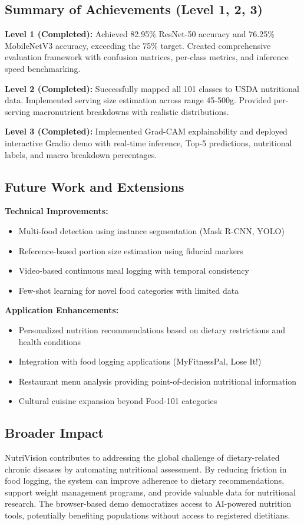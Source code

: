 \documentclass[conference]{IEEEtran}
\begin{document}
\subsection{Summary of Achievements (Level 1, 2, 3)}
\textbf{Level 1 (Completed):} Achieved 82.95\% ResNet-50 accuracy and 76.25\% MobileNetV3 accuracy, exceeding the 75\% target. Created comprehensive evaluation framework with confusion matrices, per-class metrics, and inference speed benchmarking.

\textbf{Level 2 (Completed):} Successfully mapped all 101 classes to USDA nutritional data. Implemented serving size estimation across range 45-500g. Provided per-serving macronutrient breakdowns with realistic distributions.

\textbf{Level 3 (Completed):} Implemented Grad-CAM explainability and deployed interactive Gradio demo with real-time inference, Top-5 predictions, nutritional labels, and macro breakdown percentages.

\subsection{Future Work and Extensions}
\textbf{Technical Improvements:}
\begin{itemize}
    \item Multi-food detection using instance segmentation (Mask R-CNN, YOLO)
    \item Reference-based portion size estimation using fiducial markers
    \item Video-based continuous meal logging with temporal consistency
    \item Few-shot learning for novel food categories with limited data
\end{itemize}

\textbf{Application Enhancements:}
\begin{itemize}
    \item Personalized nutrition recommendations based on dietary restrictions and health conditions
    \item Integration with food logging applications (MyFitnessPal, Lose It!)
    \item Restaurant menu analysis providing point-of-decision nutritional information
    \item Cultural cuisine expansion beyond Food-101 categories
\end{itemize}

\subsection{Broader Impact}
NutriVision contributes to addressing the global challenge of dietary-related chronic diseases by automating nutritional assessment. By reducing friction in food logging, the system can improve adherence to dietary recommendations, support weight management programs, and provide valuable data for nutritional research. The browser-based demo democratizes access to AI-powered nutrition tools, potentially benefiting populations without access to registered dietitians.
\end{document}
